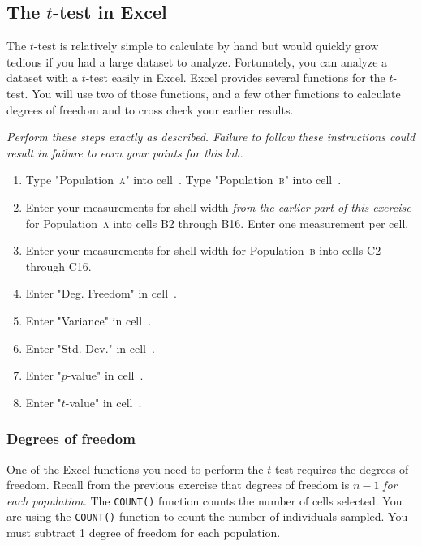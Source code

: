 \documentclass[12pt]{exam}
\newcommand*\Popa{Population~\textsc{a}}
\newcommand*\Popb{Population~\textsc{b}}
\newcommand*\xcell[1]{cell~\liningnum{#1}}
\begin{document}
\subsection*{The $t$-test in Excel}

The $t$-test is relatively simple to calculate by hand but would quickly grow tedious if you had a large dataset to analyze. Fortunately, you can analyze a dataset with a $t$-test easily in Excel. Excel provides several functions for the $t$-test. You will use two of those functions, and a few other functions to calculate degrees of freedom and to cross check your earlier results.

\emph{Perform these steps exactly as described. Failure to follow these instructions could result in failure to earn your points for this lab.} 

\begin{enumerate}
	\item Type "\Popa" into \xcell{B1}. Type "\Popb" into \xcell{C1}.

	\item Enter your measurements for shell width \emph{from the earlier part of this exercise} for \Popa{} into cells {\liningnum B2 through B16}. Enter one measurement per cell.
	
	\item Enter your measurements for shell width for \Popb{} into cells {\liningnum C2 through C16}.
	
	\item Enter "Deg. Freedom" in \xcell{A18}.

	\item Enter "Variance" in \xcell{A19}.
	
	\item Enter "Std. Dev." in \xcell{A20}.

	\item Enter "$p$-value" in \xcell{A21}.
	
	\item Enter "$t$-value" in \xcell{A22}.
	 
\end{enumerate}

\subsubsection*{Degrees of freedom}

One of the Excel functions you need to perform the $t$-test requires the degrees of freedom. Recall from the previous exercise that degrees of freedom is $n-1$ \emph{for each population.} The \texttt{COUNT()} function counts the number of cells selected. You are using the \texttt{COUNT()} function to count the number of individuals sampled. You must subtract 1 degree of freedom for each population.
\end{document}
